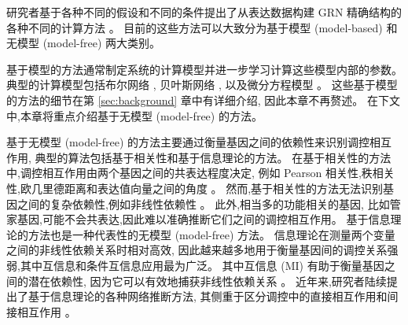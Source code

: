 研究者基于各种不同的假设和不同的条件提出了从表达数据构建 GRN 精确结构的各种不同的计算方法 。
目前的这些方法可以大致分为基于模型 (model-based) 和无模型 (model-free) 两大类别。

基于模型的方法通常制定系统的计算模型并进一步学习计算这些模型内部的参数。
典型的计算模型包括布尔网络 ,
贝叶斯网络 ,
以及微分方程模型 。
这些基于模型的方法的细节在第 \ref{sec:background} 章中有详细介绍, 因此本章不再赘述。
在下文中,本章将重点介绍基于无模型 (model-free) 的方法。

基于无模型 (model-free) 的方法主要通过衡量基因之间的依赖性来识别调控相互作用,
典型的算法包括基于相关性和基于信息理论的方法。
在基于相关性的方法中,调控相互作用由两个基因之间的共表达程度决定,
例如 Pearson 相关性,秩相关性,欧几里德距离和表达值向量之间的角度 。
然而,基于相关性的方法无法识别基因之间的复杂依赖性,例如非线性依赖性 。
此外,相当多的功能相关的基因, 比如管家基因,可能不会共表达,因此难以准确推断它们之间的调控相互作用。
基于信息理论的方法也是一种代表性的无模型 (model-free) 方法。
信息理论在测量两个变量之间的非线性依赖关系时相对高效, 
因此越来越多地用于衡量基因间的调控关系强弱,其中互信息和条件互信息应用最为广泛。
其中互信息 (MI) 有助于衡量基因之间的潜在依赖性,
因为它可以有效地捕获非线性依赖关系 。
近年来,研究者陆续提出了基于信息理论的各种网络推断方法,
其侧重于区分调控中的直接相互作用和间接相互作用 。

